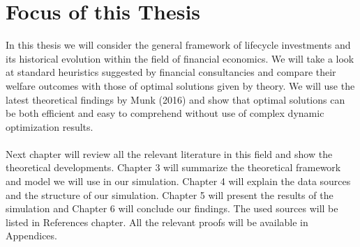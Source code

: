 \section{Focus of this Thesis}
In this thesis we will consider the general framework of lifecycle investments and its historical evolution within the field of financial economics. We will take a look at standard heuristics suggested by financial consultancies and compare their welfare outcomes with those of optimal solutions given by theory. We will use the latest theoretical findings by Munk (2016) and show that optimal solutions can be both efficient and easy to comprehend without use of complex dynamic optimization results.
\paragraph*{}Next chapter will review all the relevant literature in this field and show the theoretical developments. Chapter 3 will summarize the theoretical framework and model we will use in our simulation. Chapter 4 will explain the data sources and the structure of our simulation. Chapter 5 will present the results of the simulation and Chapter 6 will conclude our findings. The used sources will be listed in References chapter. All the relevant proofs will be available in Appendices. 
